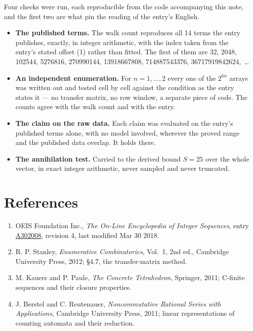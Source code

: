 \documentclass[11pt]{article}
\theoremstyle{definition}
\begin{document}
Four checks were run, each reproducible from the code accompanying this note, and the first two are what pin the reading of the entry's English.

\begin{itemize}

\item {\bfseries The published terms.} The walk count reproduces all 14 terms the entry publishes, exactly, in integer arithmetic, with the index taken from the entry's stated offset (1) rather than fitted. The first of them are 32, 2048, 102544, 5276816, 270990144, 13918667808, 714887543376, 36717919842624,~\dots

\item {\bfseries An independent enumeration.} For $n = 1,\dots,2$ every one of the $2^{6n}$ arrays was written out and tested cell by cell against the condition as the entry states it --- no transfer matrix, no row window, a separate piece of code. The counts agree with the walk count and with the entry.

\item {\bfseries The claim on the raw data.} Each claim was evaluated on the entry's published terms alone, with no model involved, wherever the proved range and the published data overlap. It holds there.

\item {\bfseries The annihilation test.} Carried to the derived bound $S = 25$ over the whole vector, in exact integer arithmetic, never sampled and never truncated.

\end{itemize}

\section{References}

\begin{enumerate}

\item OEIS Foundation Inc., \emph{The On-Line Encyclopedia of Integer Sequences}, entry \href{https://oeis.org/A302008}{A302008}, revision 4, last modified Mar 30 2018.

\item R. P. Stanley, \emph{Enumerative Combinatorics}, Vol.~1, 2nd ed., Cambridge University Press, 2012; \S4.7, the transfer-matrix method.

\item M. Kauers and P. Paule, \emph{The Concrete Tetrahedron}, Springer, 2011; C-finite sequences and their closure properties.

\item J. Berstel and C. Reutenauer, \emph{Noncommutative Rational Series with Applications}, Cambridge University Press, 2011; linear representations of counting automata and their reduction.

\end{enumerate}
\end{document}
